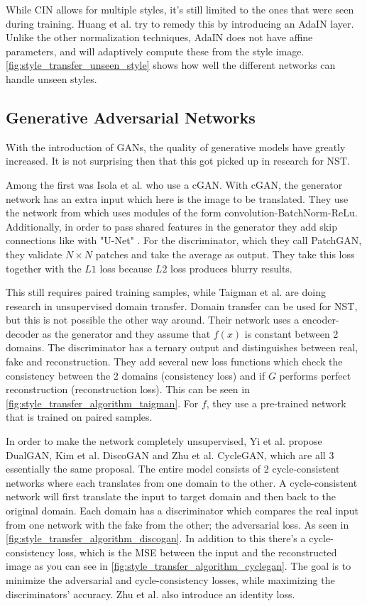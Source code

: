 While \gls{CIN} allows for multiple styles, it's still limited to the ones that were seen during training.
Huang et al. \cite{Huang2017} try to remedy this by introducing an \gls{AdaIN} layer.
Unlike the other normalization techniques, \gls{AdaIN} does not have affine parameters, and will adaptively compute these from the style image.
\ref{fig:style_transfer_unseen_style} shows how well the different networks can handle unseen styles.

\subsection{Generative Adversarial Networks}
With the introduction of \glspl{GAN}, the quality of generative models have greatly increased.
It is not surprising then that this got picked up in research for \gls{NST}.

Among the first was Isola et al. \cite{Isola2016} who use a \gls{cGAN}.
With \gls{cGAN}, the generator network has an extra input which here is the image to be translated.
They use the network from \cite{radford2016} which uses modules of the form convolution-BatchNorm-ReLu\cite{Ioffe2015}.
Additionally, in order to pass shared features in the generator they add skip connections like with "U-Net" \cite{Ronneberger2015}.
For the discriminator, which they call PatchGAN, they validate $N\times N$ patches and take the average as output.
They take this loss together with the $L1$ loss because $L2$ loss produces blurry results.

This still requires paired training samples, while Taigman et al. \cite{Taigman2016} are doing research in unsupervised domain transfer.
Domain transfer can be used for \gls{NST}, but this is not possible the other way around.
Their network uses a encoder-decoder as the generator and they assume that $f(x)$ is constant between 2 domains.
The discriminator has a ternary output and distinguishes between real, fake and reconstruction.
They add several new loss functions which check the consistency between the 2 domains (consistency loss) and if $G$ performs perfect reconstruction (reconstruction loss).
This can be seen in \ref{fig:style_transfer_algorithm_taigman}.
For $f$, they use a pre-trained network that is trained on paired samples.

In order to make the network completely unsupervised, Yi et al.\cite{Yi2017} propose DualGAN, Kim et al. \cite{Kim2017} DiscoGAN and Zhu et al. \cite{Zhu2017} CycleGAN, which are all 3 essentially the same proposal.
The entire model consists of 2 cycle-consistent networks where each translates from one domain to the other.
A cycle-consistent network will first translate the input to target domain and then back to the original domain.
Each domain has a discriminator which compares the real input from one network with the fake from the other; the adversarial loss. As seen in \ref{fig:style_transfer_algorithm_discogan}.
In addition to this there's a cycle-consistency loss, which is the \gls{MSE} between the input and the reconstructed image as you can see in \ref{fig:style_transfer_algorithm_cyclegan}.
The goal is to minimize the adversarial and cycle-consistency losses, while maximizing the discriminators' accuracy.
Zhu et al. \cite{Zhu2017} also introduce an identity loss.


